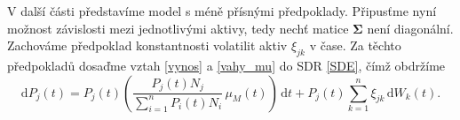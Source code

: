 \documentclass[a4paper,12pt]{report}
\theoremstyle{definition} \newtheorem{definice}[veta]{Definice}
\theoremstyle{remark}
\begin{document}

V další části představíme model s méně přísnými předpoklady.
Připusťme nyní možnost závislosti mezi jednotlivými aktivy, tedy nechť matice $\boldsymbol{\Sigma}$ není diagonální.
Zachováme předpoklad konstantnosti volatilit aktiv $\xi_{jk}$ v čase.
Za těchto předpokladů dosaďme vztah \eqref{vynos} a \eqref{vahy_mu} do SDR \eqref{SDE}, čímž obdržíme
\begin{equation} \label{SDE_cen}
 \mathrm{d}P_j(t)=P_j(t)\left(\frac{P_j(t)N_j}{\sum_{i=1}^n P_i(t)N_i}\, \mu_M(t)\right)\,\mathrm{d}t+P_j(t)\sum_{k=1}^{n}\xi_{jk}\,\mathrm{d}W_k(t).
\end{equation}
\end{document}
